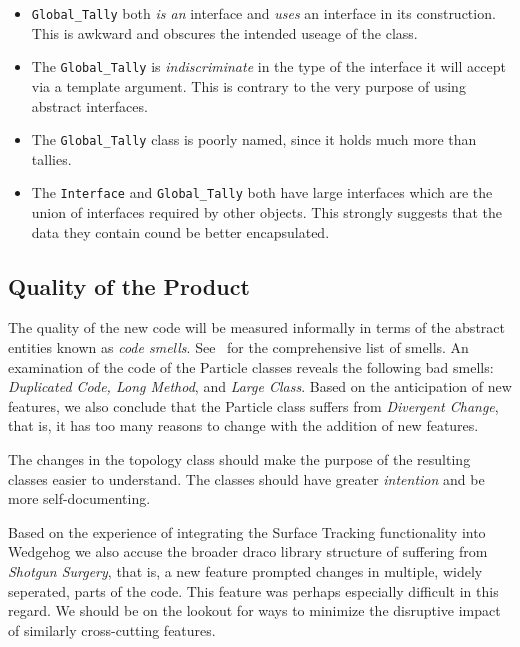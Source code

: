 \documentclass[11pt]{nmemo}
\begin{document}
\begin{itemize}
\item {\tt Global\_Tally} both {\em is an} interface and {\em uses} an
  interface in its construction. This is awkward and obscures the
  intended useage of the class.

\item The {\tt Global\_Tally} is {\em indiscriminate} in the type of the
interface it will accept via a template argument. This is contrary to
the very purpose of using abstract interfaces.

\item The {\tt Global\_Tally} class is poorly named, since it holds much
more than tallies.

\item The {\tt Interface} and {\tt Global\_Tally} both have large
  interfaces which are the union of interfaces required by other
  objects. This strongly suggests that the data they contain cound be
  better encapsulated.

\end{itemize}

\subsection*{Quality of the Product}

The quality of the new code will be measured informally in terms of
the abstract entities known as {\em code smells}. See~\cite[Chapter
3]{fowler00} for the comprehensive list of smells. An examination of
the code of the Particle classes reveals the following bad smells:
{\em Duplicated Code, Long Method}, and {\em Large Class}.  Based on
the anticipation of new features, we also conclude that the Particle
class suffers from {\em Divergent Change}, that is, it has too many
reasons to change with the addition of new features. 

The changes in the topology class should make the purpose of the
resulting classes easier to understand. The classes should have
greater {\em intention} and be more self-documenting.

Based on the experience of integrating the Surface Tracking
functionality into Wedgehog we also accuse the broader draco library
structure of suffering from {\em Shotgun Surgery}, that is, a new
feature prompted changes in multiple, widely seperated, parts of the
code. This feature was perhaps especially difficult in this regard. We
should be on the lookout for ways to minimize the disruptive impact of
similarly cross-cutting features.
\end{document}
